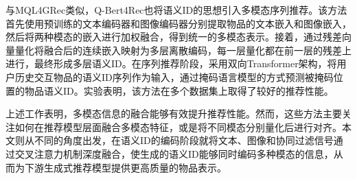 与MQL4GRec类似，Q-Bert4Rec\cite{qbert4rec2024}也将语义ID的思想引入多模态序列推荐。该方法首先使用预训练的文本编码器和图像编码器分别提取物品的文本嵌入和图像嵌入，然后将两种模态的嵌入进行加权融合，得到统一的多模态表示。接着，通过残差向量量化将融合后的连续嵌入映射为多层离散编码，每一层量化都在前一层的残差上进行，最终形成多层语义ID。在序列推荐阶段，采用双向Transformer架构，将用户历史交互物品的语义ID序列作为输入，通过掩码语言模型的方式预测被掩码位置的物品语义ID。实验表明，该方法在多个数据集上取得了较好的推荐性能。

上述工作表明，多模态信息的融合能够有效提升推荐性能。然而，这些方法主要关注如何在推荐模型层面融合多模态特征，或是将不同模态分别量化后进行对齐。本文则从不同的角度出发，在语义ID的编码阶段就将文本、图像和协同过滤信号通过交叉注意力机制深度融合，使生成的语义ID能够同时编码多种模态的信息，从而为下游生成式推荐模型提供更高质量的物品表示。
